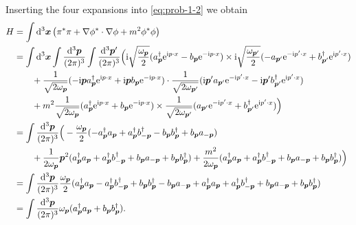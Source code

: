 \documentclass[hyperref, a4paper]{article}
\newcommand*{\ii}{\mathrm{i}}
\newcommand*{\ee}{\mathrm{e}}
\begin{document}
\begin{itemize}
    Inserting the four expansions into \eqref{eq:prob-1-2} we obtain 
    \[
        \begin{aligned}
            H &= \int \dd[3]{\vb*{x}} \left(\pi^{*} \pi+\nabla \phi^{*} \cdot \nabla \phi+m^{2} \phi^{*} \phi\right) \\
            &= \int \dd[3]{\vb*{x}} \int \frac{\dd[3]{\vb*{p}}}{(2\pi)^3} \int \frac{\dd[3]{\vb*{p}'}}{(2\pi)^3} \Big( \ii \sqrt{\frac{\omega_{\vb*{p}}}{2}} (a^\dagger_{\vb*{p}} \ee^{\ii p \cdot x} - b_{\vb*{p}} \ee^{- \ii p \cdot x}) \times \ii \sqrt{\frac{\omega_{\vb*{p}'}}{2}} (- a_{\vb*{p}'} \ee^{- \ii p' \cdot x} + b^\dagger_{\vb*{p}'} \ee^{\ii p' \cdot x})  \\
            &\quad \quad + \frac{1}{\sqrt{2\omega_{\vb*{p}}}} ( - \ii \vb*{p} a^\dagger_{\vb*{p}} \ee^{\ii p \cdot x} + \ii \vb*{p} b_{\vb*{p}} \ee^{- \ii p \cdot x}) \cdot \frac{1}{\sqrt{2\omega_{\vb*{p}'}}} ( \ii \vb*{p}' a_{\vb*{p}'} \ee^{- \ii p' \cdot x} - \ii \vb*{p}' b^\dagger_{\vb*{p}'} \ee^{\ii p' \cdot x})  \\
            &\quad \quad + m^2 \frac{1}{\sqrt{2\omega_{\vb*{p}}}} (a^\dagger_{\vb*{p}} \ee^{\ii p \cdot x} + b_{\vb*{p}} \ee^{- \ii p \cdot x}) \times \frac{1}{\sqrt{2\omega_{\vb*{p}'}}} (a_{\vb*{p}'} \ee^{- \ii p' \cdot x} + b^\dagger_{\vb*{p}'} \ee^{\ii p' \cdot x}) \Big) \\
            &= \int \frac{\dd[3]{\vb*{p}}}{(2\pi)^3} \Big(- \frac{\omega_{\vb*{p}}}{2} (- a^\dagger_{\vb*{p}} a_{\vb*{p}} +a^\dagger_{\vb*{p}} b^\dagger_{-\vb*{p}} - b_{\vb*{p}} b^\dagger_{\vb*{p}} + b_{\vb*{p}} a_{-\vb*{p}} )  \\
            &\quad \quad + \frac{1}{2\omega_{\vb*{p}}} \vb*{p}^2 (a^\dagger_{\vb*{p}} a_{\vb*{p}} + a^\dagger_{\vb*{p}} b^\dagger_{-\vb*{p}} + b_{\vb*{p}} a_{-\vb*{p}} + b_{\vb*{p}} b^\dagger_{\vb*{p}}) + \frac{m^2}{2 \omega_{\vb*{p}}} (a_{\vb*{p}}^\dagger a_{\vb*{p}} + a^\dagger_{\vb*{p}} b^\dagger_{- \vb*{p}} + b_{\vb*{p}} a_{- \vb*{p}} + b_{\vb*{p}} b^\dagger_{\vb*{p}} ) \Big) \\
            &= \int \frac{\dd[3]{\vb*{p}}}{(2\pi)^3} \frac{\omega_{\vb*{p}}}{2} ( a^\dagger_{\vb*{p}} a_{\vb*{p}} - a^\dagger_{\vb*{p}} b^\dagger_{-\vb*{p}} + b_{\vb*{p}} b^\dagger_{\vb*{p}} - b_{\vb*{p}} a_{-\vb*{p}} + a_{\vb*{p}}^\dagger a_{\vb*{p}} + a^\dagger_{\vb*{p}} b^\dagger_{- \vb*{p}} + b_{\vb*{p}} a_{- \vb*{p}} + b_{\vb*{p}} b^\dagger_{\vb*{p}} ) \\
            &= \int \frac{\dd[3]{\vb*{p}}}{(2\pi)^3} \omega_{\vb*{p}} (a^\dagger_{\vb*{p}} a_{\vb*{p}} + b_{\vb*{p}} b^\dagger_{\vb*{p}}).

\end{aligned}\]
\end{itemize}
\end{document}
